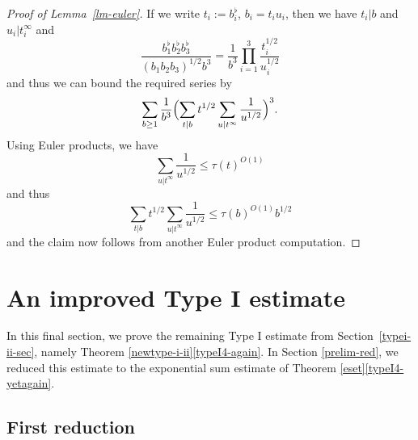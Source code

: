 \documentclass[12pt,a4paper,reqno]{amsart}
\numberwithin{equation}{section}
\theoremstyle{plain}
\theoremstyle{definition}
\begin{document}
\begin{proof}[Proof of Lemma~\ref{lm-euler}]  If we write $t_i := b_i^\flat$, $b_i = t_i u_i$, then we have $t_i | b$ and $u_i | t_i^\infty$ and
$$ 
\frac{b_1^\flat b_2^\flat b_3^\flat}{(b_1b_2b_3)^{1/2} b^3} = \frac{1}{b^3} \prod_{i=1}^3 \frac{t_i^{1/2}}{u_i^{1/2}} $$
and thus we can bound the required series by
$$ \sum_{b \geq 1} \frac{1}{b^3} \Bigl(\sum_{t|b} t^{1/2} \sum_{u|t^\infty} \frac{1}{u^{1/2}}\Bigr)^3.$$
Using Euler products, we have
$$ \sum_{u|t^\infty} \frac{1}{u^{1/2}} \leq \tau(t)^{O(1)}$$
and thus
$$ \sum_{t|b} t^{1/2} \sum_{u|t^\infty} \frac{1}{u^{1/2}} \leq \tau(b)^{O(1)} b^{1/2}$$
and the claim now follows from another Euler product computation.
\end{proof}


\section{An improved Type I estimate}\label{typei-advanced-sec}

In this final section, we prove the remaining Type I estimate from
Section~\ref{typei-ii-sec}, namely Theorem
\ref{newtype-i-ii}\eqref{typeI4-again}. In Section \ref{prelim-red},
we reduced this estimate to the exponential sum estimate of Theorem
\ref{eset}\eqref{typeI4-yetagain}.  

\subsection{First reduction}
\end{document}
